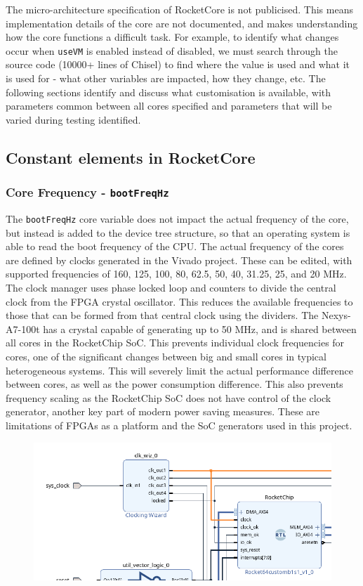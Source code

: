 The micro-architecture specification of RocketCore is not publicised. This means implementation details of the core are not documented, and makes understanding how the core functions a difficult task. For example, to identify what changes occur when \texttt{useVM} is enabled instead of disabled, we must search through the source code (10000+ lines of Chisel\cite{}) to find where the value is used and what it is used for - what other variables are impacted, how they change, etc. The following sections identify and discuss what customisation is available, with parameters common between all cores specified and parameters that will be varied during testing identified.
\subsection{Constant elements in RocketCore}
\subsubsection{Core Frequency - \texttt{bootFreqHz}}
The \texttt{bootFreqHz} core variable does not impact the actual frequency of the core, but instead is added to the device tree structure, so that an operating system is able to read the boot frequency of the CPU. The actual frequency of the cores are defined by clocks generated in the Vivado project. These can be edited, with supported frequencies of 160, 125, 100, 80, 62.5, 50, 40, 31.25, 25, and 20 MHz. The clock manager uses phase locked loop and counters to divide the central clock from the FPGA crystal oscillator. This reduces the available frequencies to those that can be formed from that central clock using the dividers. The Nexys-A7-100t has a crystal capable of generating up to 50 MHz, and is shared between all cores in the RocketChip SoC. This prevents individual clock frequencies for cores, one of the significant changes between big and small cores in typical heterogeneous systems. This will severely limit the actual performance difference between cores, as well as the power consumption difference. This also prevents frequency scaling as the RocketChip SoC does not have control of the clock generator, another key part of modern power saving measures. These are limitations of FPGAs as a platform and the SoC generators used in this project.

\begin{figure}
    \includegraphics[]{./img/single_clock_rocketchip.png}
\end{figure}

